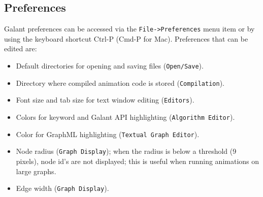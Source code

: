 \subsection{Preferences}
\label{sec:preferences}

Galant preferences can be accessed via the \texttt{File->Preferences}
menu item or by using the keyboard shortcut \textsf{Ctrl-P}
(\textsf{Cmd-P} for Mac).
Preferences that can be edited are:
\begin{itemize}
\item
Default directories for opening and saving files (\texttt{Open/Save}).
\item
Directory where compiled animation code is stored (\texttt{Compilation}).
\item
Font size and tab size for text window editing (\texttt{Editors}).
\item
Colors for keyword and Galant API highlighting (\texttt{Algorithm~Editor}).
\item
Color for GraphML highlighting (\texttt{Textual~Graph~Editor}).
\item
Node radius (\texttt{Graph~Display});
when the radius is below a threshold (9 pixels), node id's are not displayed;
this is useful when running animations on large graphs.
\item
Edge width (\texttt{Graph~Display}).
\end{itemize}

